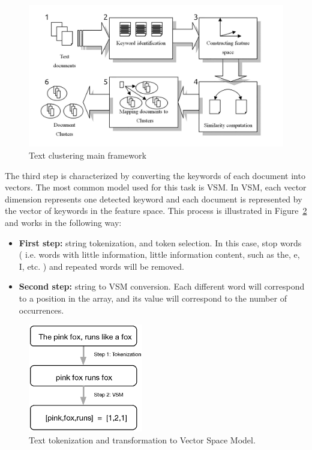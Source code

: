 \begin{figure}
  \begin{center}
    \includegraphics[width=12cm]{images/1_Text_Clustering_Main_Framwork.png}
  \end{center}
  \caption{ Text clustering main framework~\cite{Dozono2012} }
  \label{fig:1_Text_Clustering_Main_Framwork}
\end{figure}

The third step is characterized by converting the keywords of each document into vectors. The most common model used for this task is \ac{VSM}. In \ac{VSM}, each vector dimension represents one detected keyword and each document is represented by the vector of keywords in the feature space. This process is illustrated in Figure~\ref{fig:2_svm} and works in the following way:
\begin{itemize}
  \item \textbf{First step:} string tokenization, and token selection. In this case, stop words ( i.e. words with little information, little information content, such as the, e, I, etc. ) and repeated words will be removed.
  \item \textbf{Second step:} string to \ac{VSM} conversion. Each different word will correspond to a position in the array, and its value will correspond to the number of occurrences. 
\end{itemize}

\begin{figure}
  \begin{center}
    \includegraphics[width=5cm]{images/2_svm.eps}
  \end{center}
  \caption{ Text tokenization and transformation to Vector Space Model. }
  \label{fig:2_svm}
\end{figure}

